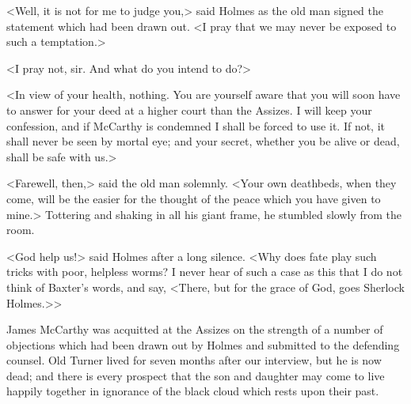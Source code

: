 <Well, it is not for me to judge you,> said Holmes as the old man signed the statement which had been drawn out. <I pray that we may never be exposed to such a temptation.>

<I pray not, sir. And what do you intend to do?>

<In view of your health, nothing. You are yourself aware that you will soon have to answer for your deed at a higher court than the Assizes. I will keep your confession, and if McCarthy is condemned I shall be forced to use it. If not, it shall never be seen by mortal eye; and your secret, whether you be alive or dead, shall be safe with us.>

<Farewell, then,> said the old man solemnly. <Your own deathbeds, when they come, will be the easier for the thought of the peace which you have given to mine.> Tottering and shaking in all his giant frame, he stumbled slowly from the room.

<God help us!> said Holmes after a long silence. <Why does fate play such tricks with poor, helpless worms? I never hear of such a case as this that I do not think of Baxter's words, and say, <There, but for the grace of God, goes Sherlock Holmes.>>

James McCarthy was acquitted at the Assizes on the strength of a number of objections which had been drawn out by Holmes and submitted to the defending counsel. Old Turner lived for seven months after our interview, but he is now dead; and there is every prospect that the son and daughter may come to live happily together in ignorance of the black cloud which rests upon their past.